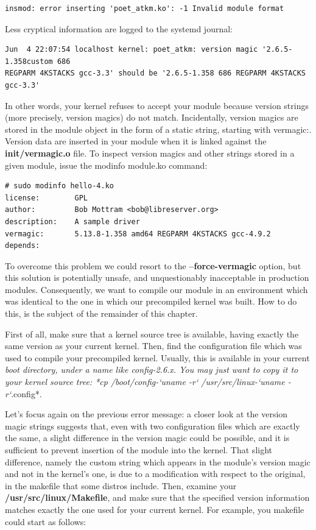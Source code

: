 \documentclass[11pt]{article}
\begin{document}
\begin{verbatim}
insmod: error inserting 'poet_atkm.ko': -1 Invalid module format
\end{verbatim}

Less cryptical information are logged to the systemd journal:

\begin{verbatim}
Jun  4 22:07:54 localhost kernel: poet_atkm: version magic '2.6.5-1.358custom 686
REGPARM 4KSTACKS gcc-3.3' should be '2.6.5-1.358 686 REGPARM 4KSTACKS gcc-3.3'
\end{verbatim}

In other words, your kernel refuses to accept your module because version strings (more precisely, version magics) do not match. Incidentally, version magics are stored in the module object in the form of a static string, starting with vermagic:. Version data are inserted in your module when it is linked against the \textbf{init/vermagic.o} file. To inspect version magics and other strings stored in a given module, issue the modinfo module.ko command:

\begin{verbatim}
# sudo modinfo hello-4.ko
license:        GPL
author:         Bob Mottram <bob@libreserver.org>
description:    A sample driver
vermagic:       5.13.8-1.358 amd64 REGPARM 4KSTACKS gcc-4.9.2
depends:
\end{verbatim}

To overcome this problem we could resort to the \textbf{--force-vermagic} option, but this solution is potentially unsafe, and unquestionably inacceptable in production modules. Consequently, we want to compile our module in an environment which was identical to the one in which our precompiled kernel was built. How to do this, is the subject of the remainder of this chapter.

First of all, make sure that a kernel source tree is available, having exactly the same version as your current kernel. Then, find the configuration file which was used to compile your precompiled kernel. Usually, this is available in your current \emph{boot directory, under a name like config-2.6.x. You may just want to copy it to your kernel source tree: *cp /boot/config-`uname -r` /usr/src/linux-`uname -r`}.config*.

Let's focus again on the previous error message: a closer look at the version magic strings suggests that, even with two configuration files which are exactly the same, a slight difference in the version magic could be possible, and it is sufficient to prevent insertion of the module into the kernel. That slight difference, namely the custom string which appears in the module's version magic and not in the kernel's one, is due to a modification with respect to the original, in the makefile that some distros include. Then, examine your \textbf{/usr/src/linux/Makefile}, and make sure that the specified version information matches exactly the one used for your current kernel. For example, you makefile could start as follows:
\end{document}
